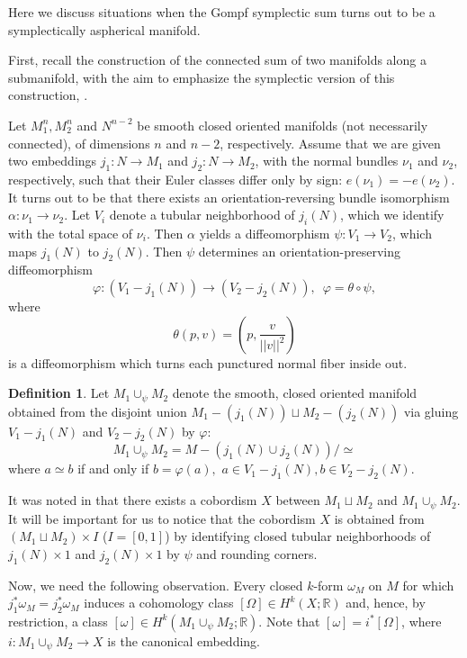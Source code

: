 \documentclass[12pt, twoside]{amsart}
\theoremstyle{plain}
\theoremstyle{definition}
\newtheorem{df}[theorem]{Definition}
\numberwithin{equation}{section}
\def\RR{\mathbb R}
\def\RR{\mathbb R}
\def\m{\medskip}
\begin{document}
Here we discuss situations when the Gompf symplectic sum turns out to be a 
symplectically aspherical manifold.

\m First, recall the construction of the connected sum of two manifolds 
along a submanifold, with the aim to emphasize the symplectic version of this
construction, \cite{G1} . 

\m Let $M_1^n, M_2^n$ and $N^{n-2}$ be smooth closed oriented manifolds (not 
necessarily connected), of dimensions $n$ and $n-2$, respectively. Assume that 
we are given two embeddings $j_1: N\to M_1$ and $j_2: N\to M_2$, with the 
normal 
bundles $\nu_1$ and $\nu_2$, respectively, such that their Euler classes 
differ 
only by sign: 
$e(\nu_1)=-e(\nu_2)$. It turns out to be that there exists an 
orientation-reversing bundle isomorphism $\alpha: \nu_1 \to \nu_2$.  Let $V_i$ 
denote a tubular neighborhood of $j_i(N)$, which we identify with the total 
space of $\nu_i$. Then $\alpha$ yields a diffeomorphism $\psi: V_1\to V_2$,
which maps $j_1(N)$ to $j_2(N)$. Then $\psi$ determines an 
orientation-preserving diffeomorphism
$$
\varphi: (V_1-j_1(N))\to (V_2-j_2(N)), \,\,\,\varphi=\theta\circ\psi,
$$
where 
$$
\theta(p,v)=(p,\frac v {||v||^2})
$$ is a diffeomorphism which turns each
punctured normal fiber inside out.

\begin{df}\label{df-sum}
 \rm Let $M_1\cup_{\psi}M_2$ denote the smooth, closed oriented
manifold obtained from the disjoint union $M_1-(j_1(N))\sqcup M_2-(j_2(N))$ 
via 
gluing $V_1-j_1(N)$ and $V_2-j_2(N)$ by $\varphi$:
%
$$
M_1\cup_{\psi}M_2=M-(j_1(N)\cup j_2(N))/\simeq
$$
%
where $a\simeq b$ if and only if $b=\varphi(a),\,\,a\in V_1-j_1(N),b\in 
V_2-j_2(N).$
\end{df}

It was noted in \cite{G1} that there exists a cobordism $X$ between $M_1\sqcup 
M_2$ and 
$M_1\cup_{\psi}M_2$. It will be important for us to notice that the cobordism 
$X$ is 
obtained from
$(M_1\sqcup M_2)\times I$  ($I=[0,1]$) by identifying closed tubular 
neighborhoods of 
$j_1(N)\times 1$ and $j_2(N)\times 1$ by $\psi$ and rounding corners.

\m Now, we need the following observation. Every closed
$k$-form $\omega_M$ on $M$ for which $j_1^*\omega_M=j_2^*\omega_M$ induces a
cohomology class $[\Omega]\in H^k(X;\RR)$ and, hence, by restriction, a class
$[\omega]\in H^k(M_1\cup_{\psi}M_2;\RR)$. Note that $[\omega]=i^*[\Omega]$, 
where $i:M_1\cup_{\psi}M_2\to X$ is the canonical embedding.
\end{document}
